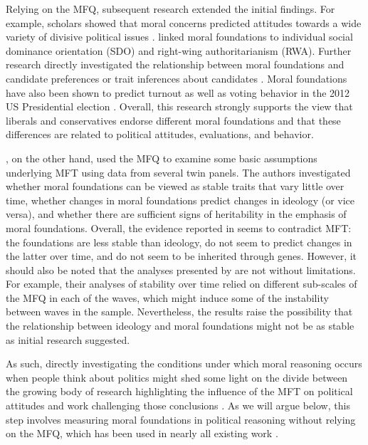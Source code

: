 \documentclass[12pt]{article}
\begin{document}
Relying on the MFQ, subsequent research extended the initial findings. For example, scholars showed that moral concerns predicted attitudes towards a wide variety of divisive political issues \citep[e.g.][]{koleva2012tracing,kertzer2014moral,low2015moral}. \citet{federico2013mapping} linked moral foundations to individual social dominance orientation (SDO) and right-wing authoritarianism (RWA). Further research directly investigated the relationship between moral foundations and candidate preferences \citep{iyer2010beyond} or trait inferences about candidates \citep{clifford2014linking}. Moral foundations have also been shown to predict turnout \citep{johnson2014ideology} as well as voting behavior in the 2012 US Presidential election \citep{franks2015using}. Overall, this research strongly supports the view that liberals and conservatives endorse different moral foundations and that these differences are related to political attitudes, evaluations, and behavior.

\citet{smith2016intuitive}, on the other hand, used the MFQ to examine some basic assumptions underlying MFT using data from several twin panels. The authors investigated whether moral foundations can be viewed as stable traits that vary little over time, whether changes in moral foundations predict changes in ideology (or vice versa), and whether there are sufficient signs of heritability in the emphasis of moral foundations. Overall, the evidence reported in \citet{smith2016intuitive} seems to contradict MFT: the foundations are less stable than ideology, do not seem to predict changes in the latter over time, and do not seem to be inherited through genes. However, it should also be noted that the analyses presented by \citet{smith2016intuitive} are not without limitations. For example, their analyses of stability over time relied on different sub-scales of the MFQ in each of the waves, which might induce some of the instability between waves in the sample. Nevertheless, the results raise the possibility that the relationship between ideology and moral foundations might not be as stable as initial research suggested.

As such, directly investigating the conditions under which moral reasoning occurs when people think about politics might shed some light on the divide between the growing body of research highlighting the influence of the MFT on political attitudes and work challenging those conclusions \citep[e.g.][]{smith2016intuitive}. As we will argue below, this step involves measuring moral foundations in political reasoning without relying on the MFQ, which has been used in nearly all existing work \citep[but see][]{clifford2014linking}.
\end{document}
